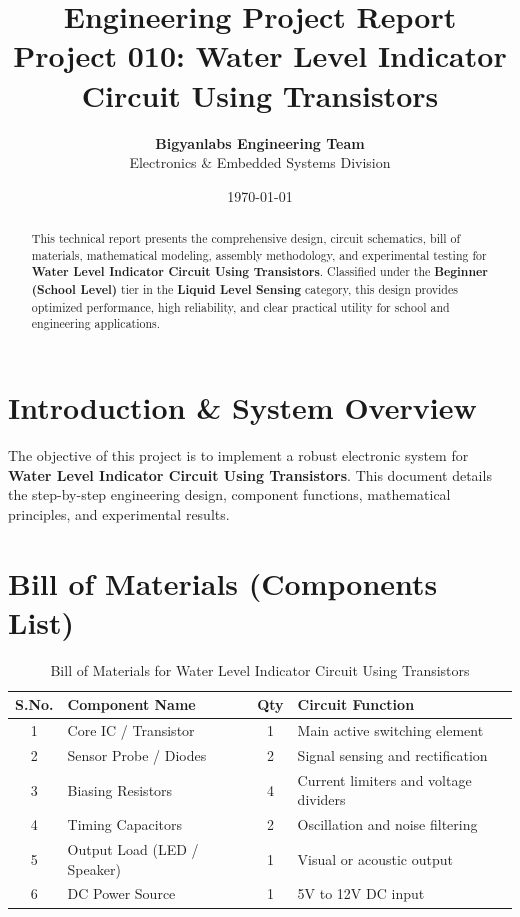 \documentclass[11pt,a4paper]{article}
\title{\textbf{\Huge Engineering Project Report}\\[0.5em] \Large Project 010: Water Level Indicator Circuit Using Transistors}
\author{\textbf{Bigyanlabs Engineering Team}\\ Electronics \& Embedded Systems Division}
\date{\today}
\begin{document}
\maketitle
\thispagestyle{empty}

\begin{abstract}
This technical report presents the comprehensive design, circuit schematics, bill of materials, mathematical modeling, assembly methodology, and experimental testing for \textbf{Water Level Indicator Circuit Using Transistors}. Classified under the \textbf{Beginner (School Level)} tier in the \textbf{Liquid Level Sensing} category, this design provides optimized performance, high reliability, and clear practical utility for school and engineering applications.
\end{abstract}

\newpage
\tableofcontents
\newpage

\section{Introduction \& System Overview}
The objective of this project is to implement a robust electronic system for \textbf{Water Level Indicator Circuit Using Transistors}. This document details the step-by-step engineering design, component functions, mathematical principles, and experimental results.

\section{Bill of Materials (Components List)}
\begin{table}[h!]
\centering
\caption{Bill of Materials for Water Level Indicator Circuit Using Transistors}
\vspace{0.5em}
\begin{tabular}{clcp{7cm}}
\toprule
\textbf{S.No.} & \textbf{Component Name} & \textbf{Qty} & \textbf{Circuit Function} \\
\midrule
1 & Core IC / Transistor & 1 & Main active switching element \\
2 & Sensor Probe / Diodes & 2 & Signal sensing and rectification \\
3 & Biasing Resistors & 4 & Current limiters and voltage dividers \\
4 & Timing Capacitors & 2 & Oscillation and noise filtering \\
5 & Output Load (LED / Speaker) & 1 & Visual or acoustic output \\
6 & DC Power Source & 1 & 5V to 12V DC input \\
\bottomrule
\end{tabular}
\end{table}
\end{document}

